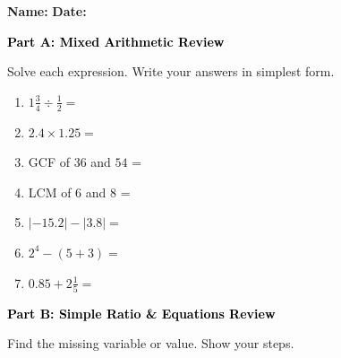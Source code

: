 \documentclass[12pt, letterpaper, fleqn]{article}
\newcommand{\blanklong}{\underline{\hspace{6.5cm}}}
\newcommand{\blankshorter}{\underline{\hspace{1.5cm}}}
\begin{document}
\textbf{Name:} \underline{\hspace{5cm}}
\hfill
\textbf{Date:} \underline{\hspace{3cm}}\\

\begin{tcolorbox}[colback=black!10]
    \large\textcolor{black}{\textbf{Part A: Mixed Arithmetic Review}}
\end{tcolorbox}

\vspace{3mm}

\noindent
Solve each expression. Write your answers in simplest form.

\vspace{5mm}

\begin{enumerate}[itemsep=1.8cm, leftmargin=0.6cm]
\item $1\frac{3}{4} \div \frac{1}{2} = $ \blanklong
\item $2.4 \times 1.25 = $ \blanklong
\item GCF of $36$ and $54$ = \blankshorter
\item LCM of $6$ and $8$ = \blankshorter
\item $|-15.2| - |3.8| = $ \blanklong
\item $2^4 - (5 + 3) = $ \blanklong
\item $0.85 + 2\frac{1}{5} = $ \blanklong
\end{enumerate}

\newpage

\begin{tcolorbox}[colback=black!10]
    \large\textcolor{black}{\textbf{Part B: Simple Ratio \& Equations Review}}
\end{tcolorbox}

\vspace{3mm}

\noindent
Find the missing variable or value. Show your steps.

\vspace{5mm}
\end{document}
